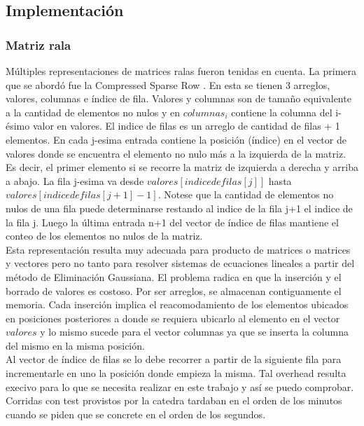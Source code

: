 \subsection{Implementación}

\subsubsection{Matriz rala}

Múltiples representaciones de matrices ralas fueron tenidas en cuenta. La primera que se abordó fue la Compressed Sparse Row \cite{CSR}. En esta se tienen 3 arreglos, valores, columnas e índice de fila. Valores y columnas son de tamaño equivalente a la cantidad de elementos no nulos y en $columnas_{i}$ contiene la columna del i-ésimo valor en valores. El indice de filas es un arreglo de cantidad de filas + 1 elementos. 
En cada j-esima entrada contiene la posición (índice) en el vector de valores donde se encuentra el elemento no nulo más a la izquierda de la matriz. Es decir, el primer elemento si se recorre la matriz de izquierda a derecha y arriba a abajo. La fila j-esima va desde $valores[indice de filas[j]]$ hasta $valores[indice de filas[j+1]-1]$. Notese que la cantidad de elementos no nulos de una fila puede determinarse restando al indice de la fila j+1 el indice de la fila j. Luego la última entrada n+1 del vector de índice de filas mantiene el conteo de los elementos no nulos de la matriz.  \\

Esta representación resulta muy adecuada para producto de matrices o matrices y vectores pero no tanto para resolver sistemas de ecuaciones lineales a partir del método de Eliminación Gaussiana. El problema radica en que la inserción y el borrado de valores es costoso. Por ser arreglos, se almacenan contiguamente el memoria. Cada inserción implica el reacomodamiento de los elementos ubicados en posiciones posteriores a donde se requiera ubicarlo al elemento en el vector $valores$ y lo mismo sucede para el vector columnas ya que se inserta la columna del mismo en la misma posición.\\

Al vector de índice de filas se lo debe recorrer a partir de la siguiente fila para incrementarle en uno la posición donde empieza la misma. Tal overhead resulta execivo para lo que se necesita realizar en este trabajo y así se puedo comprobar. Corridas con test provistos por la catedra tardaban en el orden de los minutos cuando se piden que se concrete en el orden de los segundos.\\

